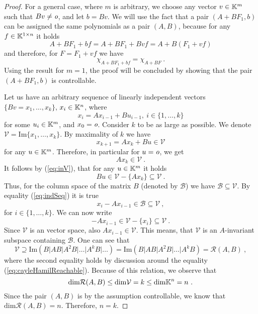 \begin{proof}
    For a general case, where $m$ is arbitrary, we choose any vector $v\in\mathbb{K}^m$ such that $Bv\neq \textit{o}$, and let $b=Bv$. We will use the fact that a pair $(A+BF_1,b)$ can be assigned the same polynomials as a pair $(A,B)$, because for any $f\in\mathbb{K}^{1\times n}$ it holds
    $${A+BF_1+bf}={A+BF_1+Bvf}={A+B(F_1+vf)}$$
    and therefore, for $F=F_1+vf$ we have 
    $$\chi_{A+BF_1+bf}=\chi_{A+BF}\ .$$
    Using the result for $m=1$, the proof will be concluded by showing that the pair $(A+BF_1,b)$ is controllable.
       
    Let us have an arbitrary sequence of linearly independent vectors $\{Bv=x_1,\ldots,x_k\}$, $x_i\in\mathbb{K}^n$, where
    \begin{equation}
    \label{eq:indSeq}
        x_{i}=Ax_{i-1}+Bu_{i-1},\ i\in\{1,\ldots,k\}
    \end{equation}
    for some $u_i\in\mathbb{K}^m$, and $x_0=\textit{o}$. Consider $k$ to be as large as possible. We denote $\mathcal{V}=\text{Im}\{x_1,\ldots,x_k\}$. By maximality of $k$ we have
    \begin{equation}
    \label{eq:inV}    
        x_{k+1}=Ax_k+Bu\in\mathcal{V}
    \end{equation}
    for any $u\in\mathbb{K}^m$. Therefore, in particular for $u=\textit{o}$, we get 
    $$Ax_k\in\mathcal{V}\ .$$
    It follows by (\ref{eq:inV}), that for any $u\in\mathbb{K}^m$ it holds
    $$Bu\in\mathcal{V}-\{Ax_k\}\subseteq\mathcal{V}\ .$$
    Thus, for the column space of the matrix $B$ (denoted by $\mathcal{B}$) we have $\mathcal{B}\subseteq \mathcal{V}$. By equality (\ref{eq:indSeq}) it is true
    $$x_i-Ax_{i-1}\in\mathcal{B}\subseteq \mathcal{V}\ ,$$
    for $i\in\{1,\ldots,k\}$. We can now write 
    $$-Ax_{i-1}\in\mathcal{V}-\{x_i\}\subseteq \mathcal{V}\ .$$
    Since $\mathcal{V}$ is an vector space, also $Ax_{i-1}\in\mathcal{V}$. This means, that $\mathcal{V}$ is an $A$-invariant subspace containing $\mathcal{B}$. One can see that
    $$\mathcal{V}\supseteq\text{Im}(B|AB|A^2B|\ldots|A^kB|\ldots)=\text{Im}(B|AB|A^2B|\ldots|A^kB)=\mathcal{R}(A,B)\ ,$$
    where the second equality holds by discussion around the equality (\ref{eq:cayleHamilReachable}). Because of this relation, we observe that
    $$\text{dim}\mathcal{R}(A,B)\leq\text{dim}\mathcal{V}=k\leq\text{dim}\K^n=n\ .$$
    Since the pair $(A,B)$ is by the assumption controllable, we know that $\text{dim}\mathcal{R}(A,B)=n$. Therefore, $n=k$.


\end{proof}
